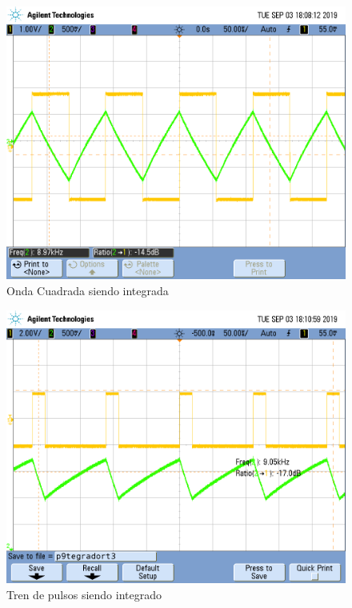 \documentclass[a4paper]{article}
\begin{document}
\begin{figure}[H]
	\centering
	\includegraphics[width=\textwidth]{Ejercicio4/FOTOS-TP2-TC-EJ4/i9tegradort}
	\caption{Onda Cuadrada siendo integrada}
\end{figure}

\begin{figure}[H]
	\centering
	\includegraphics[width=\textwidth]{Ejercicio4/FOTOS-TP2-TC-EJ4/p9tegradort3}
	\caption{Tren de pulsos siendo integrado}
\end{figure}
\end{document}
